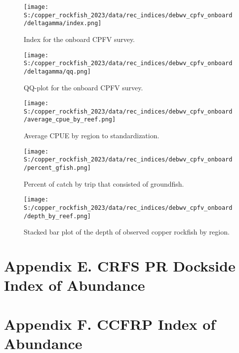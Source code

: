 \documentclass[11pt,
  english,
  letterpaper,
]{article}
\begin{document}
\newpage

\begin{figure}
\centering
\texttt{[image: S:/copper\_rockfish\_2023/data/rec\_indices/debwv\_cpfv\_onboard/deltagamma/index.png]}
\caption{Index for the onboard CPFV survey.\label{fig:deb-index}}
\end{figure}

\newpage

\begin{figure}
\centering
\texttt{[image: S:/copper\_rockfish\_2023/data/rec\_indices/debwv\_cpfv\_onboard/deltagamma/qq.png]}
\caption{QQ-plot for the onboard CPFV survey.\label{fig:deb-qq}}
\end{figure}

\newpage

\begin{figure}
\centering
\texttt{[image: S:/copper\_rockfish\_2023/data/rec\_indices/debwv\_cpfv\_onboard/average\_cpue\_by\_reef.png]}
\caption{Average CPUE by region to standardization.\label{fig:deb-regioncpue}}
\end{figure}

\newpage

\begin{figure}
\centering
\texttt{[image: S:/copper\_rockfish\_2023/data/rec\_indices/debwv\_cpfv\_onboard/percent\_gfish.png]}
\caption{Percent of catch by trip that consisted of groundfish.\label{fig:deb-percent-gfish}}
\end{figure}

\newpage

\begin{figure}
\centering
\texttt{[image: S:/copper\_rockfish\_2023/data/rec\_indices/debwv\_cpfv\_onboard/depth\_by\_reef.png]}
\caption{Stacked bar plot of the depth of observed copper rockfish by region.\label{fig:deb-depths}}
\end{figure}

\newpage

\hypertarget{crfs-pr-index}{%
\section{Appendix E. CRFS PR Dockside Index of Abundance}\label{crfs-pr-index}}

\hypertarget{ccfrp-index}{%
\section{Appendix F. CCFRP Index of Abundance}\label{ccfrp-index}}
\end{document}
